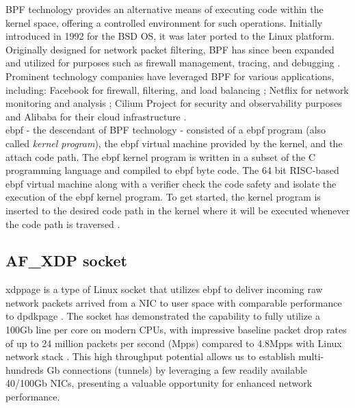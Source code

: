 \ac{BPF} technology provides an alternative means of executing code within the kernel space, offering a controlled environment for such operations. 
Initially introduced in 1992 for the \ac{BSD} OS, it was later ported to the Linux platform. 
Originally designed for network packet filtering, \ac{BPF} has since been expanded and utilized for purposes such as firewall management, tracing, and debugging \cite{McCanne_intro_bpf} \cite{lwn_intro_ebpf}. 
Prominent technology companies have leveraged \ac{BPF} for various applications, including: Facebook for firewall, filtering, and load balancing \cite{facebook_katran_ebpf_2018}; Netflix for network monitoring and analysis \cite{netflix_network_insight}; Cilium Project for security and observability purposes \cite{cilium_io_page} and Alibaba for their cloud infrastructure \cite{alibaba_cloud_ebpf}.
\\

\ac{ebpf} - the descendant of \ac{BPF} technology - consisted of a \ac{ebpf} program (also called \textit{kernel program}), the \ac{ebpf} virtual machine provided by the kernel, and the attach code path.
The \ac{ebpf} kernel program is written in a subset of the C programming language and compiled to \ac{ebpf} byte code.
The 64 bit \ac{RISC}-based \ac{ebpf} virtual machine along with a verifier check the code safety and isolate the execution of the \ac{ebpf} kernel program.
To get started, the kernel program is inserted to the desired code path in the kernel where it will be executed whenever the code path is traversed \cite{lwn_intro_ebpf}.



\subsection{AF\_XDP socket}
\ac{xdppage} is a type of Linux socket that utilizes \ac{ebpf} to deliver incoming raw network packets arrived from a \ac{NIC} to user space with comparable performance to \ac{dpdkpage} \cite{karlsson_path_to_dpdk_speednodate}. 
The socket has demonstrated the capability to fully utilize a 100Gb line per core on modern CPUs, with impressive baseline packet drop rates of up to 24 million packets per second (Mpps) compared to 4.8Mpps with Linux network stack \cite{hoiland_jorgensen_express_2018} \cite{intel_dpdk_perf}.
This high throughput potential allows us to establish multi-hundreds Gb connections (tunnels) by leveraging a few readily available 40/100Gb NICs, presenting a valuable opportunity for enhanced network performance.

